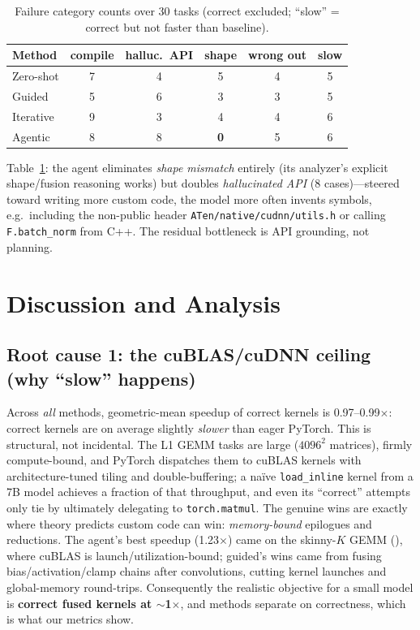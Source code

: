 \documentclass[conference]{IEEEtran}
\begin{document}
\begin{table}[t]
\caption{Failure category counts over 30 tasks (correct excluded; ``slow'' =
correct but not faster than baseline).}
\label{tab:taxonomy}
\centering
\begin{tabular}{lccccc}
\toprule
Method & compile & halluc.\ API & shape & wrong out & slow \\
\midrule
Zero-shot & 7 & 4 & 5 & 4 & 5 \\
Guided    & 5 & 6 & 3 & 3 & 5 \\
Iterative & 9 & 3 & 4 & 4 & 6 \\
Agentic   & 8 & 8 & \textbf{0} & 5 & 6 \\
\bottomrule
\end{tabular}
\end{table}

Table~\ref{tab:taxonomy}: the agent eliminates \emph{shape mismatch} entirely (its
analyzer's explicit shape/fusion reasoning works) but doubles \emph{hallucinated
API} (8 cases)---steered toward writing more custom code, the model more often
invents symbols, e.g.\ including the non-public header
\texttt{ATen/native/cudnn/utils.h} or calling \texttt{F.batch\_norm} from C++.
The residual bottleneck is API grounding, not planning.

\section{Discussion and Analysis}\label{sec:fail}

\subsection{Root cause 1: the cuBLAS/cuDNN ceiling (why ``slow'' happens)}

Across \emph{all} methods, geometric-mean speedup of correct kernels is
0.97--0.99$\times$: correct kernels are on average slightly \emph{slower} than
eager PyTorch. This is structural, not incidental. The L1 GEMM tasks are large
($4096^2$ matrices), firmly compute-bound, and PyTorch dispatches them to cuBLAS
kernels with architecture-tuned tiling and double-buffering; a na\"ive
\texttt{load\_inline} kernel from a 7B model achieves a fraction of that
throughput, and even its ``correct'' attempts only tie by ultimately delegating to
\texttt{torch.matmul}. The genuine wins are exactly where theory predicts custom
code can win: \emph{memory-bound} epilogues and reductions. The agent's best
speedup (1.23$\times$) came on the skinny-$K$ GEMM
(), where cuBLAS is launch/utilization-bound;
guided's wins came from fusing bias/activation/clamp chains after convolutions,
cutting kernel launches and global-memory round-trips. Consequently the realistic
objective for a small model is \textbf{correct fused kernels at $\sim$1$\times$},
and methods separate on correctness, which is what our metrics show.
\end{document}
